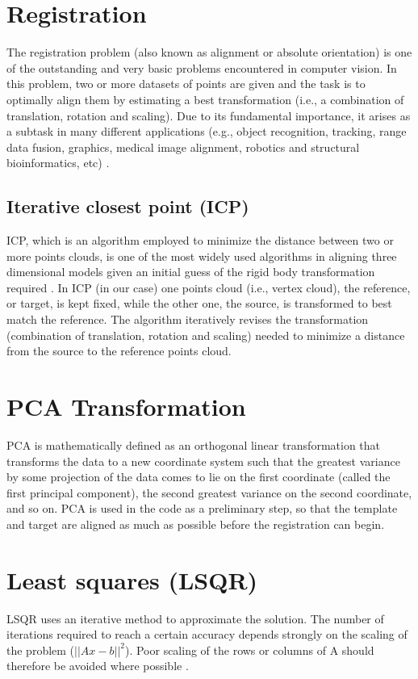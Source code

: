 \documentclass[../structure.tex]{subfiles}
\begin{document}
	
\section{Registration}
	The registration problem (also known as alignment or absolute orientation) is one of the outstanding and very basic problems encountered in computer vision. In this problem, two or more datasets of points are given and the task is to optimally align them by estimating a best transformation (i.e., a combination of translation, rotation and scaling). Due to its fundamental importance, it arises as a subtask in many different applications (e.g., object recognition, tracking, range data fusion, graphics, medical image alignment, robotics and structural bioinformatics, etc) \cite{Li2007}.
		\subsection{Iterative closest point (ICP)}
		 ICP, which is an algorithm employed to minimize the distance between two or more points clouds, is one of the most widely used algorithms in aligning three dimensional models given an initial guess of the rigid body transformation required \cite{Zhang1994}.
		 In ICP (in our case) one points cloud (i.e., vertex cloud), the reference, or target, is kept fixed, while the other one, the source, is transformed to best match the reference. The algorithm iteratively revises the transformation (combination of translation, rotation and scaling) needed to minimize a distance from the source to the reference points cloud.
\section{PCA Transformation}
PCA is mathematically defined as an orthogonal linear transformation that transforms the data to a new coordinate system such that the greatest variance by some projection of the data comes to lie on the first coordinate (called the first principal component), the second greatest variance on the second coordinate, and so on\cite{Jolliffe2002}.
PCA is used in the code as a preliminary step, so that the template and target are aligned as much as possible before the registration can begin.
\section{Least squares (LSQR)}
LSQR uses an iterative method to approximate the solution. The number of iterations required to reach a certain accuracy depends strongly on the scaling of the problem ($ ||Ax-b||^2 $). Poor scaling of the rows or columns of A should therefore be avoided where possible \cite{Paige1982}.
\end{document}

